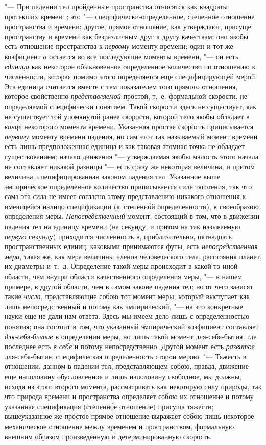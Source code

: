 "--- При падении тел пройденные пространства относятся как квадраты протекших
времен: ; это "--- специфически-определенное, степенн\'{о}е отношение пространства
и времени; другое, прямое отношение, как утверждают, присуще пространству и
времени как безразличным друг к другу качествам; оно якобы есть отношение
пространства к {\em первому} моменту времени; один и
тот же коэфициент $a$ остается во все последующие
моменты времени, "--- он есть {\em единица} как некоторое
обыкновенное определенное количество по отношению к численности, которая
помимо этого определяется еще специфицирующей мерой. Эта единица считается
вместе с тем показателем того прямого отношения, которое свойственно
{\em представляемой} простой, т.~е. формальной
скорости, не определяемой специфически понятием. Такой скорости здесь не
существует, как не существует той упомянутой ранее скорости, которой тело
якобы обладает в {\em конце} некоторого момента
времени. Указанная простая скорость приписывается
{\em первому} моменту времени падения, но сам этот так
называемый момент времени есть лишь предположенная единица и как таковая
атомная точка не обладает существованием; начало движения "--- утверждаемая
якобы малость этого начала не составляет никакой разницы "--- есть сразу же
некоторая величина, и притом величина, специфицированная законом падения
тел. Указанное выше эмпирическое определенное количество приписывается силе
тяготения, так что сама эта сила не имеет согласно этому представлению
никакого отношения к имеющейся налицо спецификации (к~степенн\'{о}й
определенности), к своеобразию определения меры.
{\em Непосредственный} момент, состоящий в том, что в
движении падения тел на единицу времени (на секунду, и притом на так
называемую {\em первую} секунду) приходится численность
в, приблизительно, пятнадцать пространственных единиц, каковыми принимаются
футы, есть {\em непосредственная мера}, такая же, как
мера величины членов человеческого тела, расстояния планет, их диаметры
и~т.~д. Определение такой меры происходит в какой-то иной области, чем
внутри области качественного определения меры, "--- в нашем примере, в другой
области, чем в самом законе падения тел; но от чего зависят такие
{\em числа}, представляющие собою тот момент меры,
который выступает как лишь непосредственный и потому как эмпирический, "--- на
это конкретные науки еще не дали нам ответа. Здесь мы имеем дело лишь с
определенностью понятия; она состоит в том, что указанный эмпирический
коэфициент составляет {\em для-себя-бытие} в
определении меры, но лишь такой момент для-себя-бытия, где последнее есть
{\em в себе} и потому непосредственно. Другой момент
есть {\em развитое} для-себя-бытие, специфическая
определенность сторон мерою. "--- Тяжесть в отношении, данном в падении тел,
представляющем собою, правда, движение еще наполовину обусловленное и лишь
наполовину свободное, мы должны, исходя из этого второго момента,
рассматривать как некоторую силу природы, так что природа времени и
пространства определяет собою их отношение и потому указанная спецификация
(степенн\'{о}е отношение) присуща тяжести; вышеуказанное же простое прямое
отношение выражает собою лишь некоторое механическое отношение между
временем и пространством, формальную, внешним образом произведенную и
детерминированную скорость.

